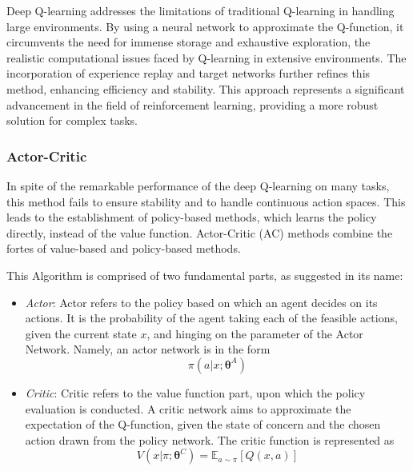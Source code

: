 \documentclass[11pt,twoside]{article}
\numberwithin{Theorem}{section}
\numberwithin{Definition}{section}
\numberwithin{Lemma}{section}
\numberwithin{Algorithm}{section}
\numberwithin{equation}{section}
\begin{document}
Deep Q-learning addresses the limitations of traditional Q-learning in handling large environments. By using a neural network to approximate the Q-function, it circumvents the need for immense storage and exhaustive exploration, the realistic computational issues faced by Q-learning in extensive environments. The incorporation of experience replay and target networks further refines this method, enhancing efficiency and stability. This approach represents a significant advancement in the field of reinforcement learning, providing a more robust solution for complex tasks.

\subsubsection{Actor-Critic}
In spite of the remarkable performance of the deep Q-learning on many tasks, this method fails to ensure stability and to handle continuous action spaces. This leads to the establishment of policy-based methods, which learns the policy directly, instead of the value function. Actor-Critic (AC) methods combine the fortes of value-based and policy-based methods.\cite{AC}

This Algorithm is comprised of two fundamental parts, as suggested in its name:
\begin{itemize}
    \item \emph{Actor}: Actor refers to the policy based on which an agent decides on its actions. It is the probability of the agent taking each of the feasible actions, given the current state $x$, and hinging on the parameter of the Actor Network. Namely, an actor network is in the form
    $$\pi(a\vert x;\boldsymbol{\theta}^A)$$
    \item \emph{Critic}: Critic refers to the value function part, upon which the policy evaluation is conducted. A critic network aims to approximate the expectation of the Q-function, given the state of concern and the chosen action drawn from the policy network. The critic function is represented as
    $$
V(x\vert\pi;\boldsymbol{\theta}^C)=\mathbb{E}_{a\sim\pi}\left[
    Q(x,a)
    \right]
    $$
\end{itemize}
\end{document}
